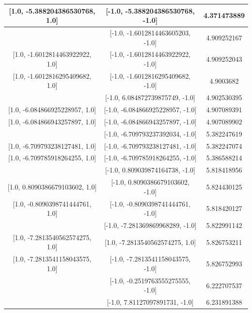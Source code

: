 \documentclass[aps]{revtex4-2}
\begin{document}
\begin{center}
\begin{tabular}{||c c c||}
        [1.0, -5.388204386530768, 1.0]&[-1.0, -5.388204386530768, -1.0]&4.371473889\\
        \hline
        [1.0, -1.6012814463605203, 1.0]&[-1.0, -1.6012814463605203, -1.0]&4.909252167\\

        [1.0, -1.6012814463922922, 1.0]&[-1.0, -1.6012814463922922, -1.0]&4.909252043\\

        [1.0, -1.6012816295409682, 1.0]&[-1.0, -1.6012816295409682, -1.0]&4.9003682\\
        \hline
        [1.0, 6.084872739875749, 1.0]&[-1.0, 6.084872739875749, -1.0]&4.902530395\\

        [1.0, -6.084866925228957, 1.0]&[-1.0, -6.084866925228957, -1.0]&4.907089391\\

        [1.0, -6.084866943257897, 1.0]&[-1.0, -6.084866943257897, -1.0]&4.907089902\\
        \hline
        [1.0, -6.709793237392034, 1.0]&[-1.0, -6.709793237392034, -1.0]&5.382247619\\

        [1.0, -6.709793238127481, 1.0]&[-1.0, -6.709793238127481, -1.0]&5.382247074\\

        [1.0, -6.709785918264255, 1.0]&[-1.0, -6.709785918264255, -1.0]&5.386588214\\
        \hline
        [1.0, 0.809039874164738, 1.0]&[-1.0, 0.809039874164738, -1.0]&5.818418956\\

        [1.0, 0.8090386679103602, 1.0]&[-1.0, 0.8090386679103602, -1.0]&5.824430125\\

        [1.0, -0.8090398741444761, 1.0]&[-1.0, -0.8090398741444761, -1.0]&5.818420127\\
        \hline
        [1.0, -7.281369869968289, 1.0]&[-1.0, -7.281369869968289, -1.0]&5.822991142\\

        [1.0, -7.2813540562574275, 1.0]&[1.0, -7.2813540562574275, 1.0]&5.826753211\\

        [1.0, -7.2813541158043575, 1.0]&[-1.0, -7.2813541158043575, -1.0]&5.826752993\\
        \hline
        [1.0, -0.2519763555275555, 1.0]&[-1.0, -0.2519763555275555, -1.0]&6.222707537\\
        \hline
        [1.0, 7.81127097891731, 1.0]&[-1.0, 7.81127097891731, -1.0]&6.231891388\\


\end{tabular}
\end{center}
\end{document}

